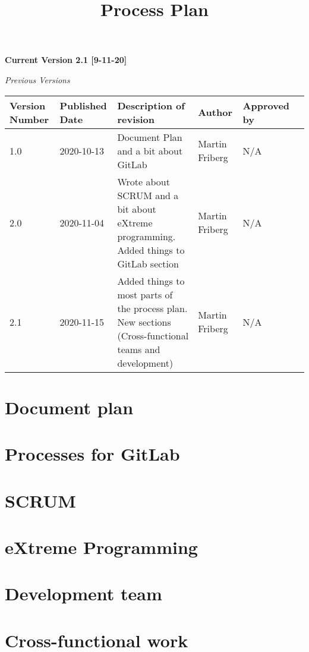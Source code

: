 \documentclass[12pt]{article}
\title{\Huge Process Plan}
\author{}
\begin{document}
\maketitle

\begin{center}
    \textbf{\large Current Version 2.1 [9-11-20]}
    \vspace{10mm}
    
    \emph{\large Previous Versions}
    
\begin{center}
\tiny
\begin{tabular}{ | m{5em} | m{5em}| m{10em} |m{5em}| m{5em} |m{5em} |  } 
\hline
Version Number& Published Date & Description of revision & Author & Approved by \\ 
\hline
1.0 & 2020-10-13 & Document Plan and a bit about GitLab & Martin Friberg & N/A \\
\hline
2.0 & 2020-11-04 & Wrote about SCRUM and a bit about eXtreme programming. Added things to GitLab section & Martin Friberg & N/A \\ 
\hline
2.1 & 2020-11-15 & Added things to most parts of the process plan. New sections (Cross-functional teams and development) & Martin Friberg & N/A \\
\hline

\end{tabular}
\end{center}

\end{center}


\clearpage

    \section{Document plan}
    

    \clearpage
    \section{Processes for GitLab}
        

    \section{SCRUM}
        
        
    \section{eXtreme Programming}
        
    
    \section{Development team}
        
        
        
    \section{Cross-functional work}
        
        
        
    
\end{document}
